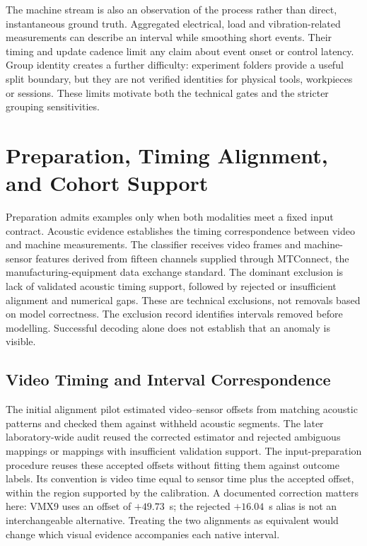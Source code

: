 The machine stream is also an observation of the process rather than direct,
instantaneous ground truth. Aggregated electrical, load and vibration-related
measurements can describe an interval while smoothing short events. Their timing and
update cadence limit any claim about event onset or control latency. Group identity
creates a further difficulty: experiment folders provide a useful split boundary, but
they are not verified identities for physical tools, workpieces or sessions. These
limits motivate both the technical gates and the stricter grouping sensitivities.

\section{Preparation, Timing Alignment, and Cohort Support}
Preparation admits examples only when both modalities meet a fixed input contract.
Acoustic evidence establishes the timing correspondence between video and machine
measurements. The classifier receives video frames and machine-sensor features derived
from fifteen channels supplied through MTConnect, the manufacturing-equipment data
exchange standard. The dominant exclusion is lack of validated acoustic timing support, followed by rejected or
insufficient alignment and numerical gaps. These are technical exclusions, not removals
based on model correctness. The exclusion record identifies intervals removed before
modelling. Successful decoding alone does not establish that an anomaly is visible.

\subsection{Video Timing and Interval Correspondence}
The initial alignment pilot estimated video--sensor offsets from matching acoustic
patterns and checked them against withheld acoustic segments. The later laboratory-wide
audit reused the corrected estimator and rejected ambiguous mappings or mappings with
insufficient validation support. The input-preparation procedure reuses these accepted offsets without
fitting them against outcome labels. Its convention is video time equal to
sensor time plus the accepted offset, within the region supported by the calibration. A
documented correction matters here: VMX9 uses an offset of $+49.73$~s; the rejected
$+16.04$~s alias is not an interchangeable alternative. Treating the two alignments as
equivalent would change which visual evidence accompanies each native interval.

